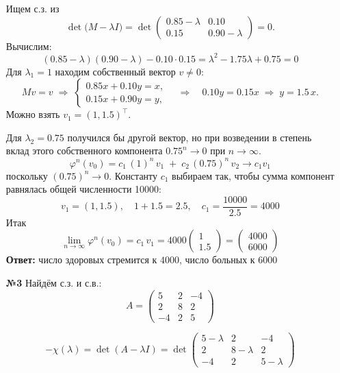 \documentclass[a4paper]{article}
\renewcommand{\phi}{\varphi}
\begin{document}
\begin{enumerate}
  Ищем с.з. из
  $$
  \det\!\bigl(M-\lambda I\bigr)
  =\det
  \begin{pmatrix}
  0.85-\lambda & 0.10\\[3pt]
  0.15 & 0.90-\lambda
  \end{pmatrix}
  =0.
  $$
  Вычислим:
  $$
  (0.85-\lambda)(0.90-\lambda)-0.10\cdot0.15
  =\lambda^2-1.75\lambda+0.75=0
  $$
  Для $\lambda_1=1$ находим собственный вектор $v\ne0$:
  $$
  M v = v
  \;\Longrightarrow\;
  \begin{cases}
  0.85x+0.10y = x,\\
  0.15x+0.90y = y,
  \end{cases}
  \quad
  \Longrightarrow
  \quad
  0.10y=0.15x
  \;\Longrightarrow\;
  y=1.5\,x.
  $$
  Можно взять $v_1=(1,1.5)^\top$.

  Для $\lambda_2=0.75$ получился бы другой вектор, но при возведении в степень вклад этого собственного компонента $0.75^n\to0$ при $n\to\infty$.
  $$
  \phi^n(v_0)
  = c_1\,(1)^n\,v_1 \;+\;c_2\,(0.75)^n\,v_2 \to c_1v_1
  $$
  поскольку $(0.75)^n\to0$. Константу $c_1$ выбираем так, чтобы сумма компонент равнялась общей численности 10000:
  $$
  v_1=(1,1.5),\quad
  1+1.5=2.5,
  \quad
  c_1=\frac{10000}{2.5}=4000
  $$
  Итак
  $$
  \lim_{n\to\infty}\phi^n(v_0)
  =c_1\,v_1
  =4000\begin{pmatrix}1\\1.5\end{pmatrix}
  =\begin{pmatrix}4000\\6000\end{pmatrix}
  $$
  \textbf{Ответ:} число здоровых стремится к $4000$, число больных к $6000$\\

  \item[\textbf{№3}]Найдём с.з. и с.в.:
  $$A=\begin{pmatrix}
    5 & 2 & -4\\
    2 & 8 & 2\\
    -4 & 2 & 5
    \end{pmatrix} $$
    
  $$
  -\chi(\lambda)=\det(A-\lambda I)
  =\det\begin{pmatrix}
  5-\lambda & 2 & -4\\
  2 & 8-\lambda & 2\\
  -4 & 2 & 5-\lambda
  \end{pmatrix}
  $$
\end{enumerate}
\end{document}
